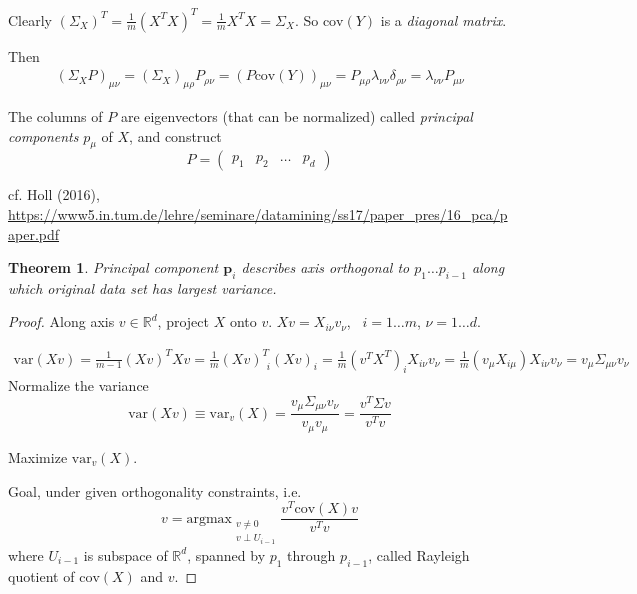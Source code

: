 \documentclass[10pt]{amsart}
\newtheorem{theorem}{Theorem}
\begin{document}
\begin{multicols*}{2}
Clearly $(\Sigma_X)^T = \frac{1}{m} (X^TX)^T = \frac{1}{m} X^T X = \Sigma_X$.  So $\text{cov}(Y)$ is a \emph{diagonal matrix}.  

Then
\begin{equation}
\begin{gathered}
	(\Sigma_X P)_{\mu \nu } = ( \Sigma_X )_{\mu \rho } P_{\rho \nu} = (P \text{cov}(Y) )_{\mu \nu } = P_{\mu \rho} \lambda_{ \nu \nu} \delta_{\rho \nu } = \lambda_{ \nu \nu} P_{\mu \nu }
\end{gathered}
\end{equation}

The columns of $P$ are eigenvectors (that can be normalized) called \emph{principal components} $p_{\mu}$ of $X$, and construct 
\[
P = \left( \begin{matrix} p_1  & p_2  &  \dots & p_d \end{matrix} \right)
\]

cf. Holl (2016), \url{https://www5.in.tum.de/lehre/seminare/datamining/ss17/paper_pres/16_pca/paper.pdf}

\begin{theorem}
	Principal component $\mathbf{p}_i$ describes axis orthogonal to $p_1 \dots p_{i-1}$ along which original data set has largest variance.  
\end{theorem}

\begin{proof}
	Along axis $v\in \mathbb{R}^d$, project $X$ onto $v$.  $Xv = X_{i\nu } v_{\nu}$, \, $i=1\dots m$, $\nu = 1\dots d$.  

\[
\begin{gathered}
\text{var}(Xv) = \frac{1}{m-1} (Xv)^T Xv = \frac{1}{m} (Xv)^T_{ \  \  i} (Xv)_i = \frac{1}{m} (v^T X^T)_i X_{i\nu} v_{\nu} = \frac{1}{m} ( v_{\mu} X_{i \mu} ) X_{i\nu } v_{\nu} = v_{\mu} \Sigma_{\mu \nu } v_{\nu}
\end{gathered}
\]	
Normalize the variance
\begin{equation}
	\text{var}(Xv) \equiv \text{var}_v(X) = \frac{ v_{\mu} \Sigma_{\mu \nu }v_{\nu } }{ v_{\mu} v_{\mu} } = \frac{ v^T \Sigma v}{ v^T v} 
\end{equation}
 
Maximize $\text{var}_v(X)$.  

Goal, under given orthogonality constraints, i.e. 
\[
v = \text{argmax}_{ \substack{ v\neq 0 \\ v\perp U_{i-1} } } \frac{ v^T \text{cov}(X) v}{ v^T v} 
\]
where $U_{i-1}$ is subspace of $\mathbb{R}^d$, spanned by $p_1$ through $p_{i-1}$, called Rayleigh quotient of $\text{cov}(X)$ and $v$.  


\end{proof}
\end{multicols*}
\end{document}
